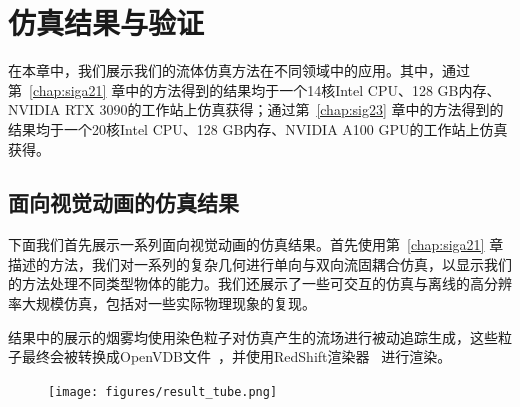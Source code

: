 \chapter{仿真结果与验证}
\label{chap:results}

在本章中，我们展示我们的流体仿真方法在不同领域中的应用。其中，通过第~\ref{chap:siga21} 章中的方法得到的结果均于一个14核Intel CPU、128 GB内存、NVIDIA RTX 3090的工作站上仿真获得；通过第~\ref{chap:sig23} 章中的方法得到的结果均于一个20核Intel CPU、128 GB内存、NVIDIA A100 GPU的工作站上仿真获得。

\section{面向视觉动画的仿真结果}
下面我们首先展示一系列面向视觉动画的仿真结果。首先使用第~\ref{chap:siga21} 章描述的方法，我们对一系列的复杂几何进行单向与双向流固耦合仿真，以显示我们的方法处理不同类型物体的能力。我们还展示了一些可交互的仿真与离线的高分辨率大规模仿真，包括对一些实际物理现象的复现。

结果中的展示的烟雾均使用染色粒子对仿真产生的流场进行被动追踪生成，这些粒子最终会被转换成OpenVDB文件~\citep{Museth-2013}，并使用RedShift渲染器~\citep{redshift} 进行渲染。

\begin{figure}[!htbp]
  \centering
    \texttt{[image: figures/result\_tube.png]}
  \label{img:result-tube}
\end{figure}

